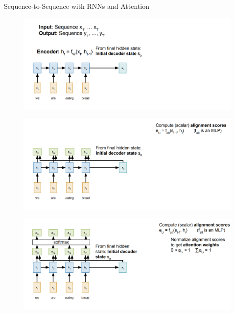 \begin{frame}[allowframebreaks]{Sequence-to-Sequence with RNNs and Attention}
    \begin{figure}
    \centering
    \includegraphics[width=1.0\textwidth,height=1.0\textheight,keepaspectratio]{images/advanced-cv/attention_1.png}
    \end{figure}  
\framebreak
    \begin{figure}
    \centering
    \includegraphics[width=1.0\textwidth,height=1.0\textheight,keepaspectratio]{images/advanced-cv/attention_2.png}
    \end{figure}  
\framebreak
    \begin{figure}
    \centering
    \includegraphics[width=1.0\textwidth,height=1.0\textheight,keepaspectratio]{images/advanced-cv/attention_3.png}
    \end{figure}  

\end{frame}
